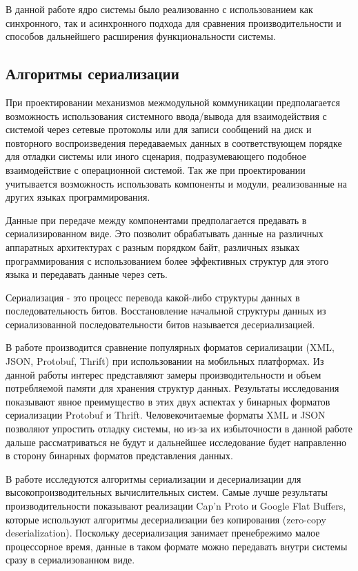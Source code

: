 В данной работе ядро системы было реализованно с использованием как синхронного, так и асинхронного подхода для сравнения производительности и способов дальнейшего расширения функциональности системы.

\subsection{Алгоритмы сериализации}

При проектировании механизмов межмодульной коммуникации предполагается возможность использования системного ввода/вывода для взаимодействия с системой через сетевые протоколы или для записи сообщений на диск и повторного воспроизведения передаваемых данных в соответствующем порядке для отладки системы или иного сценария, подразумевающего подобное взаимодействие с операционной системой. Так же при проектировании учитывается возможность использовать компоненты и модули, реализованные на других языках программирования.

Данные при передаче между компонентами предполагается предавать 
в сериализированном виде. Это позволит обрабатывать данные на 
различных аппаратных архитектурах с разным порядком байт, 
различных языках программирования с использованием более 
эффективных структур для этого языка и передавать данные через 
сеть.

Сериализация - это процесс перевода какой-либо структуры данных в последовательность битов. Восстановление начальной структуры данных из сериализованной последовательности битов называется десериализацией.

В работе \cite{sumaray2012comparison} производится сравнение популярных форматов сериализации (XML, JSON, Protobuf, Thrift) при использовании на мобильных платформах. Из данной работы интерес представляют замеры производительности и объем потребляемой памяти для хранения структур данных. Результаты исследования показывают явное преимущество в этих двух аспектах у бинарных форматов сериализации Protobuf и Thrift. Человекочитаемые форматы XML и JSON позволяют упростить отладку системы, но из-за их избыточности в данной работе дальше рассматриваться не будут и дальнейшее исследование будет направленно в сторону бинарных форматов представления данных.

В работе \cite{zaluzhnyi2016serialization} исследуются алгоритмы сериализации и десериализации для высокопроизводительных вычислительных систем. Самые лучше результаты производительности показывают реализации Cap'n Proto и Google Flat Buffers, которые используют алгоритмы десериализации без копирования (zero-copy deserialization). Поскольку десериализация занимает пренебрежимо малое процессорное время, данные в таком формате можно передавать внутри системы сразу в сериализованном виде.

